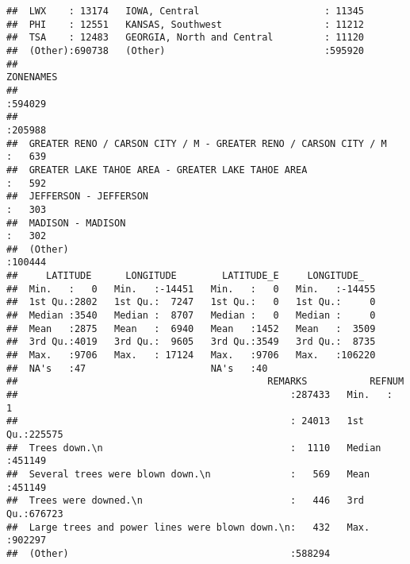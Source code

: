 \documentclass[
]{article}
\begin{document}
\begin{verbatim}
##  LWX    : 13174   IOWA, Central                      : 11345  
##  PHI    : 12551   KANSAS, Southwest                  : 11212  
##  TSA    : 12483   GEORGIA, North and Central         : 11120  
##  (Other):690738   (Other)                            :595920  
##                                                                                                                                                                                                     ZONENAMES     
##                                                                                                                                                                                                          :594029  
##                                                                                                                                                                                                          :205988  
##  GREATER RENO / CARSON CITY / M - GREATER RENO / CARSON CITY / M                                                                                                                                         :   639  
##  GREATER LAKE TAHOE AREA - GREATER LAKE TAHOE AREA                                                                                                                                                       :   592  
##  JEFFERSON - JEFFERSON                                                                                                                                                                                   :   303  
##  MADISON - MADISON                                                                                                                                                                                       :   302  
##  (Other)                                                                                                                                                                                                 :100444  
##     LATITUDE      LONGITUDE        LATITUDE_E     LONGITUDE_    
##  Min.   :   0   Min.   :-14451   Min.   :   0   Min.   :-14455  
##  1st Qu.:2802   1st Qu.:  7247   1st Qu.:   0   1st Qu.:     0  
##  Median :3540   Median :  8707   Median :   0   Median :     0  
##  Mean   :2875   Mean   :  6940   Mean   :1452   Mean   :  3509  
##  3rd Qu.:4019   3rd Qu.:  9605   3rd Qu.:3549   3rd Qu.:  8735  
##  Max.   :9706   Max.   : 17124   Max.   :9706   Max.   :106220  
##  NA's   :47                      NA's   :40                     
##                                            REMARKS           REFNUM      
##                                                :287433   Min.   :     1  
##                                                : 24013   1st Qu.:225575  
##  Trees down.\n                                 :  1110   Median :451149  
##  Several trees were blown down.\n              :   569   Mean   :451149  
##  Trees were downed.\n                          :   446   3rd Qu.:676723  
##  Large trees and power lines were blown down.\n:   432   Max.   :902297  
##  (Other)                                       :588294
\end{verbatim}
\end{document}
